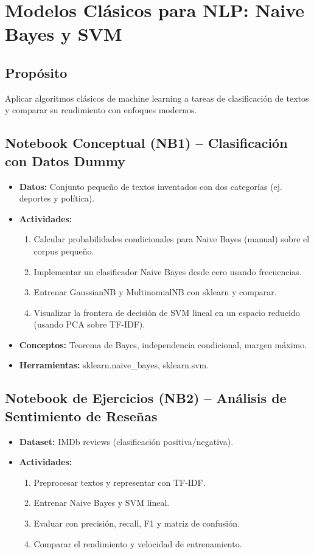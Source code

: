 \documentclass[12pt,a4paper]{article}
\begin{document}
\section{Modelos Clásicos para NLP: Naive Bayes y SVM}
\subsection*{Propósito}
Aplicar algoritmos clásicos de machine learning a tareas de clasificación de textos y comparar su rendimiento con enfoques modernos.

\subsection*{Notebook Conceptual (NB1) – Clasificación con Datos Dummy}
\begin{itemize}
    \item \textbf{Datos:} Conjunto pequeño de textos inventados con dos categorías (ej. deportes y política).
    \item \textbf{Actividades:}
    \begin{enumerate}
        \item Calcular probabilidades condicionales para Naive Bayes (manual) sobre el corpus pequeño.
        \item Implementar un clasificador Naive Bayes desde cero usando frecuencias.
        \item Entrenar GaussianNB y MultinomialNB con sklearn y comparar.
        \item Visualizar la frontera de decisión de SVM lineal en un espacio reducido (usando PCA sobre TF-IDF).
    \end{enumerate}
    \item \textbf{Conceptos:} Teorema de Bayes, independencia condicional, margen máximo.
    \item \textbf{Herramientas:} sklearn.naive\_bayes, sklearn.svm.
\end{itemize}

\subsection*{Notebook de Ejercicios (NB2) – Análisis de Sentimiento de Reseñas}
\begin{itemize}
    \item \textbf{Dataset:} IMDb reviews (clasificación positiva/negativa).
    \item \textbf{Actividades:}
    \begin{enumerate}
        \item Preprocesar textos y representar con TF-IDF.
        \item Entrenar Naive Bayes y SVM lineal.
        \item Evaluar con precisión, recall, F1 y matriz de confusión.
        \item Comparar el rendimiento y velocidad de entrenamiento.
    \end{enumerate}
\end{itemize}
\end{document}

